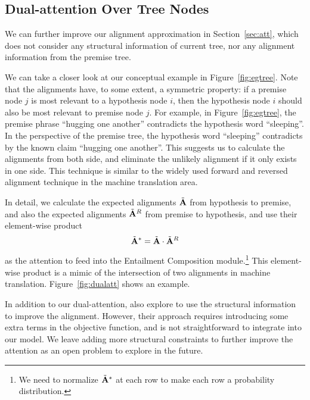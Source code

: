 \subsection{Dual-attention Over Tree Nodes}
\label{sec:dual}

We can further improve our alignment approximation 
in Section~\ref{sec:att},
which does not consider any structural information of 
current tree, nor any alignment information from the premise
tree.

We can take a closer look at our conceptual example in 
Figure~\ref{fig:egtree}.
Note that the alignments have, to some extent, 
a symmetric property: 
if a premise node $j$ is most relevant to a hypothesis node
$i$, then the hypothesis node $i$ should also be most relevant
to premise node $j$.
For example, in Figure~\ref{fig:egtree},
the premise phrase ``hugging one another'' contradicts
the hypothesis word ``sleeping''.
In the perspective of the premise tree,
the hypothesis word ``sleeping''
contradicts by the known claim ``hugging one another''.
This suggests us to calculate the 
alignments from both side, and
eliminate the unlikely alignment
if it only exists in one side.
This technique is similar to the 
widely used forward and reversed alignment
technique in the machine translation area.

In detail, we calculate the expected alignments
$\tilde{\mathbf{A}}$ from hypothesis to premise,
and also the expected alignments $\tilde{\mathbf{A}}^R$
from premise to hypothesis,
and use their element-wise product
\[\tilde{\mathbf{A}}^* = \tilde{\mathbf{A}}\cdot\tilde{\mathbf{A}}^R\] 
as the attention 
to feed into the Entailment Composition module.\footnote{
We need to normalize $\tilde{\mathbf{A}}^*$ at each row to make
each row a probability distribution.
} This element-wise product is a mimic 
of the intersection %
of two alignments in machine translation.
Figure~\ref{fig:dualatt} shows an example. %

In addition to our dual-attention, 
 also explore to use the
structural information to improve the alignment.
However, their approach requires introducing 
some extra terms in the objective function, 
and is not straightforward
to integrate into our model. 
We leave adding more structural constraints
to further improve the attention 
as an open problem to explore in the future.
